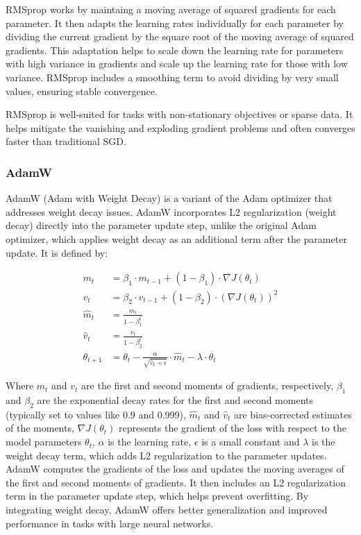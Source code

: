 RMSprop works by maintaing a moving average of squared gradients for each parameter. It then adapts the learning rates individually for each parameter by dividing the current gradient by the square root of the moving average of squared gradients.
This adaptation helps to scale down the learning rate for parameters with high variance in gradients and scale up the learning rate for those with low variance.
RMSprop includes a smoothing term to avoid dividing by very small values, ensuring stable convergence.

RMSprop is well-suited for tasks with non-stationary objectives or sparse data. It helps mitigate the vanishing and exploding gradient problems and often converges faster than traditional SGD. \cite{rmsprop}

\subsubsection{AdamW}

AdamW (Adam with Weight Decay) is a variant of the Adam optimizer that addresses weight decay issues. AdamW incorporates L2 regularization (weight decay) directly into the parameter update step, unlike the original Adam optimizer, which applies weight decay as an additional term after the parameter update. It is defined by:

\begin{align}
	m_t &= \beta_1 \cdot m_{t-1} + (1 - \beta_1) \cdot \nabla J(\theta_t) \\
	v_t &= \beta_2 \cdot v_{t-1} + (1 - \beta_2) \cdot (\nabla J(\theta_t))^2 \\
	\hat{m}_t &= \frac{m_t}{1 - \beta_1^t} \\
	\hat{v}_t &= \frac{v_t}{1 - \beta_2^t} \\
	\theta_{t+1} &= \theta_t - \frac{\alpha}{\sqrt{\hat{v}_t + \epsilon}} \cdot \hat{m}_t - \lambda \cdot \theta_t
\end{align}

Where \(m_t\) and \(v_t\) are the first and second moments of gradients, respectively, \(\beta_1\) and \(\beta_2\) are the exponential decay rates for the first and second moments (typically set to values like 0.9 and 0.999), \(\hat{m}_t\) and \(\hat{v}_t\) are bias-corrected estimates of the moments, \(\nabla J(\theta_t)\) represents the gradient of the loss with respect to the model parameters \(\theta_t\), \(\alpha\) is the learning rate, \(\epsilon\) is a small constant and \(\lambda\) is the weight decay term, which adds L2 regularization to the parameter updates. \\
AdamW computes the gradients of the loss and updates the moving averages of the first and second moments of gradients.
It then includes an L2 regularization term in the parameter update step, which helps prevent overfitting.
By integrating weight decay, AdamW offers better generalization and improved performance in tasks with large neural networks. \cite{adamW}\\

